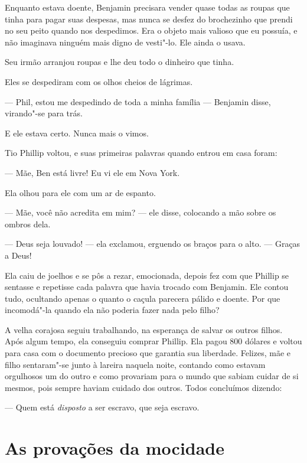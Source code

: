 Enquanto estava doente, Benjamin
precisara vender quase todas as roupas que tinha para pagar suas
despesas, mas nunca se desfez do brochezinho que prendi no seu peito
quando nos despedimos. Era o objeto mais valioso que eu possuía, e não
imaginava ninguém mais digno de vesti"-lo. Ele ainda o usava.

Seu irmão arranjou roupas e lhe deu
todo o dinheiro que tinha.

Eles se despediram com os olhos cheios
de lágrimas.

--- Phil, estou me despedindo de toda a minha família --- Benjamin
disse, virando"-se para trás.

E ele estava certo. Nunca mais o vimos.

Tio Phillip voltou, e suas primeiras
palavras quando entrou em casa foram:

--- Mãe, Ben está livre! Eu vi ele em Nova York.

Ela olhou para ele com um ar de espanto.

--- Mãe, você não acredita em mim? --- ele disse, colocando a mão sobre
os ombros dela.

--- Deus seja louvado! --- ela exclamou, erguendo os braços para o alto.
--- Graças a Deus!

Ela caiu de joelhos e se pôs a rezar, emocionada, depois fez com que
Phillip se sentasse e repetisse cada palavra que havia trocado com
Benjamin. Ele contou tudo, ocultando apenas o quanto o caçula parecera
pálido e doente. Por que incomodá"-la quando ela não poderia fazer nada
pelo filho?

A velha corajosa seguiu trabalhando, na
esperança de salvar os outros filhos. Após algum tempo, ela conseguiu
comprar Phillip. Ela pagou 800 dólares e voltou para casa com o
documento precioso que garantia sua liberdade. Felizes, mãe e filho
sentaram"-se junto à lareira naquela noite, contando como estavam
orgulhosos um do outro e como provariam para o mundo que sabiam cuidar
de si mesmos, pois sempre haviam cuidado dos outros. Todos concluímos
dizendo:

--- Quem está \emph{disposto} a ser escravo, que seja escravo.

\chapter*{As provações da mocidade}


